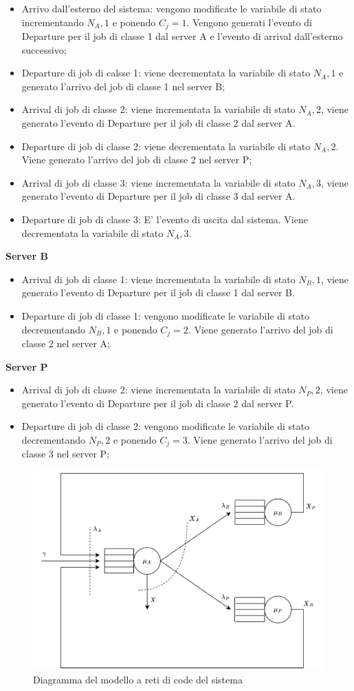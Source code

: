 \begin{itemize}
    \item Arrivo dall'esterno del sistema: vengono modificate le variabile di stato incrementando $N_A,1$ e ponendo $C_j=1$. Vengono generati l'evento di Departure per il job di classe 1 dal server A e l'evento di arrival dall'esterno successivo;
    \item Departure di job di calsse 1: viene decrementata la variabile di stato $N_A,1$ e generato l'arrivo del job di classe 1 nel server B;
    \item Arrival di job di classe 2: viene incrementata la variabile di stato $N_A,2$, viene generato l'evento di Departure per il job di classe 2 dal server A.
    \item Departure di job di classe 2: viene decrementata la variabile di stato $N_A,2$. Viene generato l'arrivo del job di classe 2 nel server P;
    \item Arrival di job di classe 3: viene incrementata la variabile di stato $N_A,3$, viene generato l'evento di Departure per il job di classe 3 dal server A.
    \item Departure di job di classe 3: E' l'evento di uscita dal sistema. Viene decrementata la variabile di stato $N_A,3$.
\end{itemize}
\textbf{Server B}
\begin{itemize}
    \item Arrival di job di classe 1: viene incrementata la variabile di stato $N_B,1$, viene generato l'evento di Departure per il job di classe 1 dal server B.
    \item Departure di job di classe 1: vengono modificate le variabile di stato decrementando $N_B,1$ e ponendo $C_j=2$. Viene generato l'arrivo del job di classe 2 nel server A;
\end{itemize}
\textbf{Server P}
\begin{itemize}
    \item Arrival di job di classe 2: viene incrementata la variabile di stato $N_P,2$, viene generato l'evento di Departure per il job di classe 2 dal server P.
    \item Departure di job di classe 2: vengono modificate le variabile di stato decrementando $N_P,2$ e ponendo $C_j=3$. Viene generato l'arrivo del job di classe 3 nel server P;
\end{itemize}

\begin{figure}
    \centering
    \includegraphics[width=\linewidth]{figs/conceptual_system.png}
    \caption{Diagramma del modello a reti di code del sistema}
    \label{fig:queue_network_model}
\end{figure}